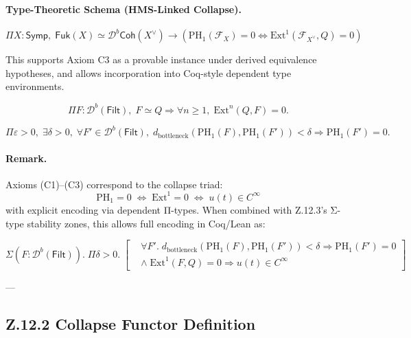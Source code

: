\documentclass[11pt]{article}
\begin{document}
\begin{axiom}
\begin{axiom}
{{\begin{description}
\paragraph{Type-Theoretic Schema (HMS-Linked Collapse).}

\[
\Pi X : \mathsf{Symp},\; \mathsf{Fuk}(X) \simeq \mathcal{D}^b\mathsf{Coh}(X^\vee) \rightarrow
\left(
  \mathrm{PH}_1(\mathcal{F}_X) = 0 \Leftrightarrow \mathrm{Ext}^1(\mathcal{F}_{X^\vee}, Q) = 0
\right)
\]

This supports Axiom C3 as a provable instance under derived equivalence hypotheses,  
and allows incorporation into Coq-style dependent type environments.


  \item[\textbf{(C4)} — Functorial Stability of Collapse:]  
  \[
  \Pi F : \mathcal{D}^b(\mathsf{Filt}),\; F \simeq Q \Rightarrow \forall n \geq 1,\; \mathrm{Ext}^n(Q, F) = 0.
  \]

  \item[\textbf{(C5)} — Barcode Stability Axiom:]  
  \[
  \Pi \varepsilon > 0,\; \exists \delta > 0,\; \forall F' \in \mathcal{D}^b(\mathsf{Filt}),\;
  d_{\text{bottleneck}}(\mathrm{PH}_1(F), \mathrm{PH}_1(F')) < \delta \Rightarrow \mathrm{PH}_1(F') = 0.
  \]
\end{description}

\paragraph{Remark.}
Axioms (C1)–(C3) correspond to the collapse triad:
\[
\mathrm{PH}_1 = 0 \;\Leftrightarrow\; \mathrm{Ext}^1 = 0 \;\Leftrightarrow\; u(t) \in C^\infty
\]
with explicit encoding via dependent Π-types. When combined with Z.12.3's Σ-type stability zones,  
this allows full encoding in Coq/Lean as:

\[
\Sigma \left( F : \mathcal{D}^b(\mathsf{Filt}) \right).\;
\Pi \delta > 0.\;
\left[
\begin{aligned}
  &\forall F'.\; d_{\text{bottleneck}}(\mathrm{PH}_1(F), \mathrm{PH}_1(F')) < \delta \Rightarrow \mathrm{PH}_1(F') = 0 \\
  &\land\; \mathrm{Ext}^1(F, Q) = 0 \Rightarrow u(t) \in C^\infty
\end{aligned}
\right]
\]


---

\subsection*{Z.12.2 Collapse Functor Definition}

}}
\end{axiom}
\end{axiom}
\end{document}

